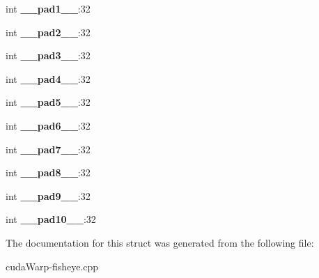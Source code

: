 \begin{DoxyCompactItemize}
\item 
int {\bfseries \+\_\+\+\_\+pad1\+\_\+\+\_\+}\+:32\hypertarget{structtimex_abf0f54d79114b234ed4e92f17577c8e3}{}\label{structtimex_abf0f54d79114b234ed4e92f17577c8e3}

\item 
int {\bfseries \+\_\+\+\_\+pad2\+\_\+\+\_\+}\+:32\hypertarget{structtimex_a929889bff57884a3f405a639c7d6a2fe}{}\label{structtimex_a929889bff57884a3f405a639c7d6a2fe}

\item 
int {\bfseries \+\_\+\+\_\+pad3\+\_\+\+\_\+}\+:32\hypertarget{structtimex_ac8f9d98e0568557531df796dc7f5edc4}{}\label{structtimex_ac8f9d98e0568557531df796dc7f5edc4}

\item 
int {\bfseries \+\_\+\+\_\+pad4\+\_\+\+\_\+}\+:32\hypertarget{structtimex_a671137e56d12dfed32b065c5581c8b09}{}\label{structtimex_a671137e56d12dfed32b065c5581c8b09}

\item 
int {\bfseries \+\_\+\+\_\+pad5\+\_\+\+\_\+}\+:32\hypertarget{structtimex_af00a2f5a40856781f53ccf9eed27eb79}{}\label{structtimex_af00a2f5a40856781f53ccf9eed27eb79}

\item 
int {\bfseries \+\_\+\+\_\+pad6\+\_\+\+\_\+}\+:32\hypertarget{structtimex_ae5775230c1d76ec4aaa42fe1d7e6e1df}{}\label{structtimex_ae5775230c1d76ec4aaa42fe1d7e6e1df}

\item 
int {\bfseries \+\_\+\+\_\+pad7\+\_\+\+\_\+}\+:32\hypertarget{structtimex_a14deffe1302d644deb2ffa5eae371e27}{}\label{structtimex_a14deffe1302d644deb2ffa5eae371e27}

\item 
int {\bfseries \+\_\+\+\_\+pad8\+\_\+\+\_\+}\+:32\hypertarget{structtimex_a56235b592c92841d640f0f7acc6be64e}{}\label{structtimex_a56235b592c92841d640f0f7acc6be64e}

\item 
int {\bfseries \+\_\+\+\_\+pad9\+\_\+\+\_\+}\+:32\hypertarget{structtimex_adf621ae90369245c821aab0256985e0a}{}\label{structtimex_adf621ae90369245c821aab0256985e0a}

\item 
int {\bfseries \+\_\+\+\_\+pad10\+\_\+\+\_\+}\+:32\hypertarget{structtimex_a785e7395145f22afcce4defd4d9dad85}{}\label{structtimex_a785e7395145f22afcce4defd4d9dad85}

\end{DoxyCompactItemize}


The documentation for this struct was generated from the following file\+:\begin{DoxyCompactItemize}
\item 
cuda\+Warp-\/fisheye.\+cpp\end{DoxyCompactItemize}

